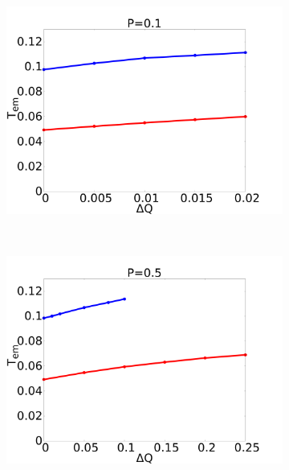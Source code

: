 \documentclass{beamer}
\begin{document}
\begin{frame}
\begin{figure}[h]
\begin{center}
\begin{subfigure}[t]{0.3\textwidth}
            \includegraphics[scale=0.09]{../images/p01_out.pdf}
        \end{subfigure} 
        \
        \begin{subfigure}[t]{0.3\textwidth}
            \includegraphics[scale=0.09]{../images/p05_out.pdf}
        \end{subfigure} 
        \
        \begin{subfigure}[t]{0.3\textwidth}

\end{subfigure}
\end{center}
\end{figure}
\end{frame}
\end{document}
